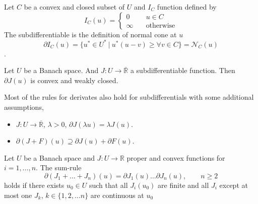 \begin{example}
	Let $C$ be a convex and closed subset of $U$ and $I_C$ function defined by
	\[
		I_C (u)=
		\left\lbrace
		\begin{array}{cl}
			0 \quad& u\in C \\
			\infty \quad& \text{otherwise}
		\end{array}
		\right.
	\]
	The subdifferentiable is the definition of normal cone at $u$
	\[\partial I_C (u)=\lbrace u^* \in U^* \ | \ u^*(u-v)\geq \forall v \in C\rbrace = \mathcal{N}_C(u)\].

\end{example}

\begin{theorem}
	Let $U$ be a Banach space. And $J: U\rightarrow \overline{\mathbb{R}}$ a subdifferentiable function. Then $\partial J(u)$ is convex and weakly closed.
\end{theorem}

\begin{remark}
	Most of the rules for derivates also hold for subdifferentials with some additional assumptions,
	\begin{itemize}
		\item $J:U\rightarrow \overline{\mathbb{R}}$, $\lambda > 0$, $\partial J(\lambda u)=\lambda J(u)$.
		\item $\partial(J+F)(u) \supseteq \partial J(u)+ \partial F(u)$.
	\end{itemize}
\end{remark}

\begin{theorem}[Rockafeller]
	Let $U$ be a Banach space and $J: U\rightarrow \mathbb{R}$ proper and convex functions for $i=1,\dots, n$.
	The sum-rule
	\[
		\partial(J_1+\dots+J_n)(u)=\partial J_1(u)\dots \partial J_n(u), \qquad n\geq 2
	\]
	holds if there exists $u_0 \in U$ such that all $J_i(u_0)$ are finite and all $J_i$ except at most one $J_k$, $k\in \lbrace 1,2,\dots n\rbrace$ are continuous at $u_0$
\end{theorem}